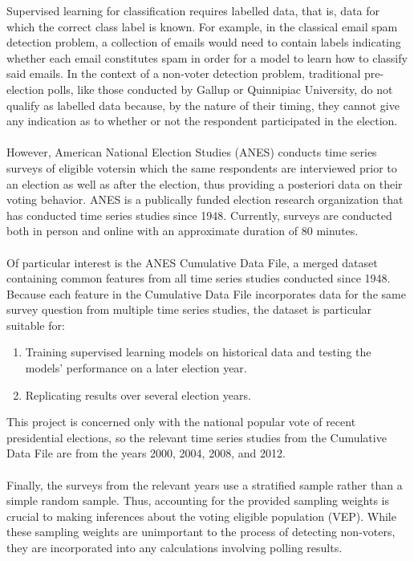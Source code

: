 \documentclass{article}
\begin{document}
	Supervised learning for classification requires labelled data, that is, data for which the correct class label is known. For example, in the classical email spam detection problem, a collection of emails would need to contain labels indicating whether each email constitutes spam in order for a model to learn how to classify said emails. In the context of a non-voter detection problem, traditional pre-election polls, like those conducted by Gallup or Quinnipiac University, do not qualify as labelled data because, by the nature of their timing, they cannot give any indication as to whether or not the respondent participated in the election.
	\\\\
	However, American National Election Studies (ANES) conducts time series surveys of eligible voters\footnotemark in which the same respondents are interviewed prior to an election as well as after the election, thus providing a posteriori data on their voting behavior. ANES is a publically funded election research organization that has conducted time series studies since 1948. Currently, surveys are conducted both in person and online with an approximate duration of 80 minutes.
	\\\\
	Of particular interest is the ANES Cumulative Data File, a merged dataset containing common features from all time series studies conducted since 1948. Because each feature in the Cumulative Data File incorporates data for the same survey question from multiple time series studies, the dataset is particular suitable for:
	\begin{enumerate}
		\item{Training supervised learning models on historical data and testing the models' performance on a later election year.}
		\item{Replicating results over several election years.}
	\end{enumerate}
	This project is concerned only with the national popular vote of recent presidential elections, so the relevant time series studies from the Cumulative Data File are from the years 2000, 2004, 2008, and 2012\footnotemark.
	\\\\
	Finally, the surveys from the relevant years use a stratified sample rather than a simple random sample. Thus, accounting for the provided sampling weights is crucial to making inferences about the voting eligible population (VEP). While these sampling weights are unimportant to the process of detecting non-voters, they are incorporated into any calculations involving polling results.
	
\end{document}
